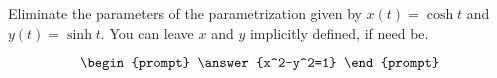 \documentclass{ximera}
\author{Gregory Hartman \and Matthew Carr}
\begin{document}
\begin{exercise}





Eliminate the parameters of the parametrization given by $x(t)=\cosh t$ and $y(t)=\sinh t$. You can leave $x$ and $y$ implicitly defined, if need be.

\[
\begin{prompt}
\answer{x^2-y^2=1}
\end{prompt}
\]

\end{exercise}
\end{document}
